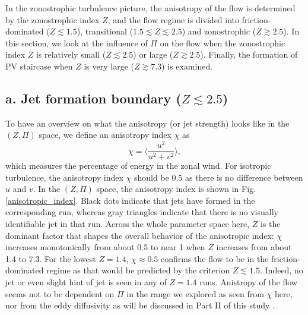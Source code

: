 \documentclass{ametsoc}
\begin{document}
In the zonostrophic turbulence picture, the anisotropy of the flow is
determined by the zonostrophic index $Z$, and the flow regime is
divided into friction-dominated ($Z\apprle1.5$), transitional ($1.5\apprle Z\apprle2.5$)
and zonostrophic ($Z\apprge2.5$). In this section, we look at the
influence of $\Pi$ on the flow when the zonostrophic index $Z$ is
relatively small ($Z\apprle2.5$) or large ($Z\apprge2.5$). Finally,
the formation of PV staircase when $Z$ is very large ($Z\apprge7.3$)
is examined.

\subsection*{a. Jet formation boundary ($Z\apprle2.5$)}

To have an overview on what the anisotropy (or jet strength) looks
like in the $(Z,\Pi)$ space, we define an anisotropy index $\chi$ as
\[
\chi=\langle\frac{u^{2}}{u^{2}+v^{2}}\rangle,
\]
which measures the percentage of energy in the zonal wind. For
isotropic turbulence, the anisotropy index $\chi$ should be 0.5
as there is no difference between $u$ and $v$. In the $(Z,\Pi)$
space, the anisotropy index is shown in Fig. \ref{anisotropic_index}.
Black dots indicate that jets have formed in the corresponding run,
whereas gray triangles indicate that there is no visually identifiable
jet in that run. Across the whole parameter space here, $Z$ is the
dominant factor that shapes the overall behavior of the anisotropic
index: $\chi$ increases monotonically from about 0.5 to near 1 when
$Z$ increases from about 1.4 to 7.3. For the lowest $Z=1.4$, $\chi\approx0.5$
confirms the flow to be in the friction-dominated regime as that would
be predicted by the criterion $Z\apprle1.5$. Indeed, no jet or even
slight hint of jet is seen in any of $Z=1.4$ runs. Anistropy of the flow 
seems not to be dependent on $\Pi$ in the range we 
explored as seen from $\chi$ here, nor from the eddy 
diffusivity as will be discussed in Part II of this study \citep{Chai2018b}.
\end{document}
